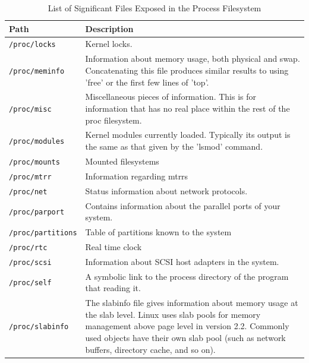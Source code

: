 \documentclass[a4paper]{article}
\begin{document}
\begin{table}
\renewcommand{\arraystretch}{1.25}
\centering
\caption{List of Significant Files Exposed in the Process Filesystem}  
\label{tbl:procfs2}
\begin{tabular}{@{}lp{8cm}@{}}
\toprule
Path & Description\\
\midrule
\texttt{/proc/locks} &
Kernel locks.\\

\texttt{/proc/meminfo} &
Information about memory usage, both physical and swap. Concatenating this file produces similar results to using 'free' or the first few lines of 'top'.\\

\texttt{/proc/misc} &
Miscellaneous pieces of information. This is for information that has no real place within the rest of the proc filesystem.\\

\texttt{/proc/modules} &
Kernel modules currently loaded. Typically its output is the same as that given by the 'lsmod' command.\\

\texttt{/proc/mounts} &
Mounted filesystems\\

\texttt{/proc/mtrr} &
Information regarding mtrrs\\

\texttt{/proc/net} &
Status information about network protocols.\\

\texttt{/proc/parport} &
Contains information about the parallel ports of your system.\\

\texttt{/proc/partitions} &
Table of partitions known to the system\\

\texttt{/proc/rtc} &
Real time clock\\

\texttt{/proc/scsi} &
Information about SCSI host adapters in the system.\\

\texttt{/proc/self} &
A symbolic link to the process directory of the program that reading it.\\

\texttt{/proc/slabinfo} &
The slabinfo file gives information about memory usage at the slab level. Linux uses slab pools for memory management above page level in version 2.2. Commonly used objects have their own slab pool (such as network buffers, directory cache, and so on).\\


\end{tabular}
\end{table}
\end{document}
